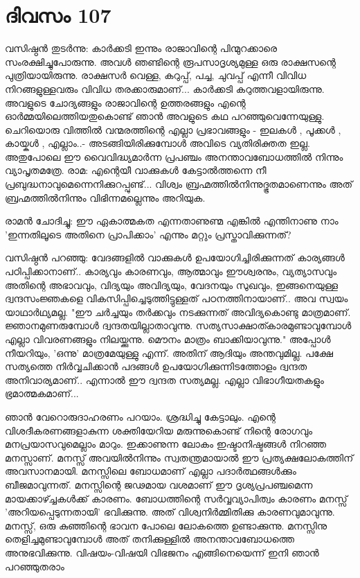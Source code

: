\newpage
\section{ദിവസം 107}


വസിഷ്ഠന്‍ തുടര്‍ന്നു: കാര്‍ക്കടി ഇന്നും രാജാവിന്റെ പിന്മുറക്കാരെ സംരക്ഷിച്ചുപോരുന്നു. അവള്‍ ഞണ്ടിന്റെ രൂപസാദൃശ്യമുള്ള ഒരു രാക്ഷസന്റെ പുത്രിയായിരുന്നു. രാക്ഷസര്‍ വെള്ള, കറുപ്പ്‌, പച്ച, ചുവപ്പ്‌ എന്നീ വിവിധ നിറങ്ങളുള്ളവരും വിവിധ തരക്കാരുമാണ്‌... കാര്‍ക്കടി കറുത്തവളായിരുന്നു. അവളുടെ ചോദ്യങ്ങളും രാജാവിന്റെ ഉത്തരങ്ങളും എന്റെ ഓര്‍മ്മയിലെത്തിയതുകൊണ്ട്‌ ഞാന്‍ അവളുടെ കഥ പറഞ്ഞുവെന്നേയുള്ളു. ചെറിയൊരു വിത്തില്‍ വന്മരത്തിന്റെ എല്ലാ പ്രഭാവങ്ങളും - ഇലകള്‍ , പൂക്കള്‍ , കായ്കള്‍ , എല്ലാം..- അടങ്ങിയിരിക്കുമ്പോള്‍ അവിടെ വ്യതിരിക്തത ഇല്ല. അതുപോലെ ഈ വൈവിദ്ധ്യമാര്‍ന്ന പ്രപഞ്ചം അനന്താവബോധത്തില്‍ നിന്നും വ്യാപൃതമത്രേ. രാമ: എന്റെയീ വാക്കുകള്‍ കേട്ടാല്‍ത്തന്നെ നീ പ്രബുദ്ധനാവുമെന്നെനിക്കുറപ്പുണ്ട്‌... വിശ്വം ബ്രഹ്മത്തില്‍നിന്നുദ്ഭൂതമാണെന്നും അത്‌ ബ്രഹ്മത്തില്‍നിന്നും വിഭിന്നമല്ലെന്നും അറിയുക.

രാമന്‍ ചോദിച്ചു: ഈ ഏകാത്മകത എന്നതാണുണ്മ എങ്കില്‍ എന്തിനാണു നാം 'ഇന്നതിലൂടെ അതിനെ പ്രാപിക്കാം' എന്നും മറ്റും പ്രസ്താവിക്കുന്നത്‌?

വസിഷ്ഠന്‍ പറഞ്ഞു: വേദങ്ങളില്‍ വാക്കുകള്‍ ഉപയോഗിച്ചിരിക്കുന്നത്‌ കാര്യങ്ങള്‍ പഠിപ്പിക്കാനാണ്‌.. കാര്യവും കാരണവും, ആത്മാവും ഈശ്വരനും, വ്യത്യാസവും അതിന്റെ അഭാവവും, വിദ്യയും അവിദ്യയും, വേദനയും സുഖവും, ഇങ്ങനെയുള്ള ദ്വന്ദസംജ്ഞകളെ വികസിപ്പിച്ചെടുത്തിട്ടുള്ളത്‌ പഠനത്തിനായാണ്‌.. അവ സ്വയം യാഥാര്‍ഥ്യമല്ല. "ഈ ചര്‍ച്ചയും തര്‍ക്കവും നടക്കുന്നത്‌ അവിദ്യകൊണ്ടു മാത്രമാണ്‌. ജ്ഞാനമുണരുമ്പോള്‍ ദ്വന്ദതയില്ലാതാവുന്നു. സത്യസാക്ഷാത്കാരമുണ്ടാവുമ്പോള്‍ എല്ലാ വിവരണങ്ങളും നിലയ്ക്കുന്നു. മൌനം മാത്രം ബാക്കിയാവുന്നു." അപ്പോള്‍ നീയറിയും, 'ഒന്നു' മാത്രമേയുള്ളു എന്ന്. അതിന്‌ ആദിയും അന്തവുമില്ല. പക്ഷേ സത്യത്തെ നിര്‍വ്വചിക്കാന്‍ പദങ്ങള്‍ ഉപയോഗിക്കുന്നിടത്തോളം ദ്വന്ദത അനിവാര്യമാണ്‌.. എന്നാല്‍ ഈ ദ്വന്ദത സത്യമല്ല. എല്ലാ വിഭാഗീയതകളും ഭ്രമാത്മകമാണ്‌...

ഞാന്‍ വേറൊരുദാഹരണം പറയാം. ശ്രദ്ധിച്ചു കേട്ടാലും. എന്റെ വിശദീകരണങ്ങളാകുന്ന ശക്തിയേറിയ മരുന്നുകൊണ്ട്‌ നിന്റെ രോഗവും മനപ്രയാസവുമെല്ലാം മാറും. ഇക്കാണുന്ന ലോകം ഇഷ്ടാനിഷ്ടങ്ങള്‍ നിറഞ്ഞ മനസ്സാണ്‌. മനസ്സ്‌ അവയില്‍നിന്നും സ്വതന്ത്രമായാല്‍ ഈ പ്രത്യക്ഷലോകത്തിന്‌ അവസാനമായി. മനസ്സിലെ ബോധമാണ്‌ എല്ലാ പദാര്‍ത്ഥങ്ങള്‍ക്കും ബീജമാവുന്നത്.  മനസ്സിന്റെ ജഢമായ വശമാണ്‌ ഈ ദൃശ്യപ്രപഞ്ചമെന്ന മായക്കാഴ്ച്ചകള്‍ക്ക്‌ കാരണം. ബോധത്തിന്റെ സര്‍വ്വവ്യാപിത്വം കാരണം മനസ്സ്‌ 'അറിയപ്പെടുന്നതായി' ഭവിക്കുന്നു. അത്‌ വിശ്വനിര്‍മ്മിതിക്കു കാരണവുമാവുന്നു. മനസ്സ്‌, ഒരു കുഞ്ഞിന്റെ ഭാവന പോലെ ലോകത്തെ ഉണ്ടാക്കുന്നു. മനസ്സിനു തെളിച്ചമുണ്ടാവുമ്പോള്‍ അത്‌ തനിക്കുള്ളില്‍ അനന്താവബോധത്തെ അനുഭവിക്കുന്നു. വിഷയം-വിഷയി വിഭജനം എങ്ങിനെയെന്ന് ഇനി ഞാന്‍ പറഞ്ഞുതരാം

